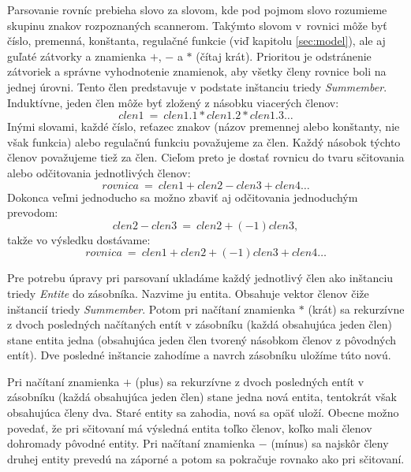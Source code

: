 \documentclass[11pt,final,oneside]{fithesis}
\begin{document}
Parsovanie rovn\'ic prebieha slovo za slovom, kde pod pojmom slovo rozumieme skupinu znakov rozpoznan\'ych scannerom. Tak\'ymto slovom v~rovnici m\^ o\v ze 
by\v t \v c\'islo, premenn\'a, kon\v stanta, regula\v cn\'e funkcie (vi\v d kapitolu \ref{sec:model}), ale aj gu\v lat\'e z\'atvorky a znamienka $+$, $-$ a
$*$ (\v c\'itaj kr\'at). Prioritou je odstr\'anenie z\'atvoriek a spr\'avne vyhodnotenie znamienok, aby v\v setky \v cleny rovnice boli na jednej \'urovni. 
Tento \v clen predstavuje v podstate in\v stanciu triedy {\it Summember}. Indukt\'ivne, jeden \v clen m\^ o\v ze by\v t zlo\v zen\'y z n\'asobku viacer\'ych 
\v clenov:
\begin{equation}
clen1 \ = \ clen1.1*clen1.2*clen1.3 \dots{}
\end{equation}
In\'ymi slovami, ka\v zd\'e \v c\'islo, re\v tazec znakov (n\'azov premennej alebo kon\v stanty, nie v\v sak funkcia) alebo regula\v cn\'u funkciu
pova\v zujeme za \v clen. Ka\v z\-d\'y n\'asobok t\'ychto \v clenov pova\v zujeme tie\v z za \v clen. Cie\v lom preto je dosta\v t rovnicu do tvaru 
s\v citovania alebo od\v citovania jednotliv\'ych \v clenov:
\begin{equation}
rovnica \ = \ clen1 + clen2 - clen3 + clen4 \dots{}
\end{equation} 
Dokonca ve\v lmi jednoducho sa mo\v zno zbavi\v t aj od\v citovania jednoduch\'ym prevodom:
\begin{equation}
clen2 - clen3 \ = \ clen2 + (-1)clen3,
\end{equation}
tak\v ze vo v\'ysledku dost\'avame:
\begin{equation}
rovnica \ = \ clen1 + clen2 + (-1)clen3 + clen4 \dots{}
\end{equation}

Pre potrebu \'upravy pri parsovan\'i uklad\'ame ka\v zd\'y jednotliv\'y \v clen ako in\v stanciu triedy {\it Entite} do z\'asobn\'ika. Nazvime ju entita.
Obsahuje vektor \v clenov \v ci\v ze in\v stanci\'i triedy {\it Summember}. Potom pri na\v c\'itan\'i znamienka $*$ (kr\'at) sa rekurz\'ivne z dvoch 
posledn\'ych na\v c\'itan\'ych ent\'it v z\'asobn\'iku (ka\v z\-d\'a obsahuj\'uca jeden \v clen) stane entita jedna (obsahuj\'uca jeden \v clen tvoren\'y 
n\'asobkom \v clenov z p\^ ovodn\'ych ent\'it). Dve posledn\'e in\v stancie zahod\'ime a navrch z\'asobn\'iku ulo\v z\'ime t\'uto nov\'u.

Pri na\v c\'itan\'i znamienka $+$ (plus) sa rekurz\'ivne z dvoch posledn\'ych ent\'it v z\'asobn\'iku (ka\v zd\'a obsahuj\'uca jeden \v clen) stane jedna nov\'a 
entita, tentokr\'at v\v sak obsahuj\'uca \v cleny dva. Star\'e entity sa zahodia, nov\'a sa op\"a\v t ulo\v z\'i. Obecne mo\v zno poveda\v t, \v ze pri 
s\v citovan\'i m\'a v\'ysledn\'a entita to\v lko \v clenov, ko\v lko mali \v clenov dohromady p\^ ovodn\'e entity. Pri na\v c\'itan\'i znamienka $-$ 
(m\'inus) sa najsk\^ or \v cleny druhej entity preved\'u na z\'aporn\'e a potom sa pokra\v cuje rovnako ako pri s\v citovan\'i.
\end{document}
